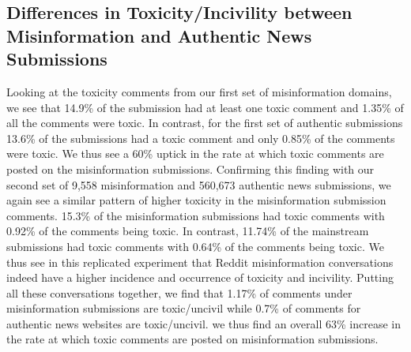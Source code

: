 \subsection{Differences in Toxicity/Incivility between Misinformation and Authentic News Submissions}\label{sec:toxicity}

Looking at the toxicity comments from our first set of misinformation domains, we see that 14.9\% of the submission had at least one toxic comment and 1.35\% of all the comments were toxic. In contrast, for the first set of authentic submissions 13.6\% of the submissions had a toxic comment and only 0.85\% of the comments were toxic. We thus see a 60\% uptick in the rate at which toxic comments are posted on the misinformation submissions. Confirming this finding with our second set of 9,558 misinformation and 560,673 authentic news submissions, we again see a similar pattern of higher toxicity in the misinformation submission comments. 15.3\% of the misinformation submissions had toxic comments with 0.92\% of the comments being toxic. In contrast, 11.74\% of the mainstream submissions had toxic comments with 0.64\% of the comments being toxic. We thus see in this replicated experiment that Reddit misinformation conversations indeed have a higher incidence and occurrence of toxicity and incivility. Putting all these conversations together, we find that 1.17\% of comments under misinformation submissions are toxic/uncivil while 0.7\% of comments for authentic news websites are toxic/uncivil. we thus find an overall 63\% increase in the rate at which toxic comments are posted on misinformation submissions.

